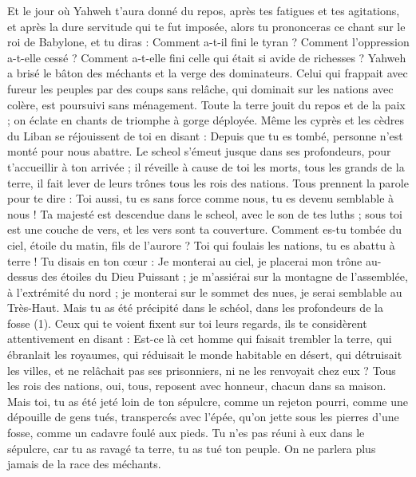 \begin{multicols}{2}
Et le jour où Yahweh t’aura donné du repos, après tes fatigues et tes agitations, et après la dure servitude qui te fut imposée,
alors tu prononceras ce chant sur le roi de Babylone, et tu diras : Comment a-t-il fini le tyran ? Comment l’oppression a-t-elle cessé ? Comment a-t-elle fini celle qui était si avide de richesses ?
Yahweh a brisé le bâton des méchants et la verge des dominateurs.
Celui qui frappait avec fureur les peuples par des coups sans relâche, qui dominait sur les nations avec colère, est poursuivi sans ménagement.
Toute la terre jouit du repos et de la paix ; on éclate en chants de triomphe à gorge déployée.
Même les cyprès et les cèdres du Liban se réjouissent de toi en disant : Depuis que tu es tombé, personne n'est monté pour nous abattre.
Le scheol s’émeut jusque dans ses profondeurs, pour t’accueillir à ton arrivée ; il réveille à cause de toi les morts, tous les grands de la terre, il fait lever de leurs trônes tous les rois des nations.
Tous prennent la parole pour te dire : Toi aussi, tu es sans force comme nous, tu es devenu semblable à nous !
Ta majesté est descendue dans le scheol, avec le son de tes luths ; sous toi est une couche de vers, et les vers sont ta couverture.
Comment es-tu tombée du ciel, étoile du matin, fils de l’aurore ? Toi qui foulais les nations, tu es abattu à terre !
Tu disais en ton cœur : Je monterai au ciel, je placerai mon trône au-dessus des étoiles du Dieu Puissant ; je m’assiérai sur la montagne de l’assemblée, à l’extrémité du nord ;
je monterai sur le sommet des nues, je serai semblable au Très-Haut.
Mais tu as été précipité dans le schéol, dans les profondeurs de la fosse (1).
Ceux qui te voient fixent sur toi leurs regards, ils te considèrent attentivement en disant : Est-ce là cet homme qui faisait trembler la terre, qui ébranlait les royaumes,
qui réduisait le monde habitable en désert, qui détruisait les villes, et ne relâchait pas ses prisonniers, ni ne les renvoyait chez eux ?
Tous les rois des nations, oui, tous, reposent avec honneur, chacun dans sa maison.
Mais toi, tu as été jeté loin de ton sépulcre, comme un rejeton pourri, comme une dépouille de gens tués, transpercés avec l'épée, qu’on jette sous les pierres d’une fosse, comme un cadavre foulé aux pieds.
Tu n’es pas réuni à eux dans le sépulcre, car tu as ravagé ta terre, tu as tué ton peuple. On ne parlera plus jamais de la race des méchants.

\end{multicols}
